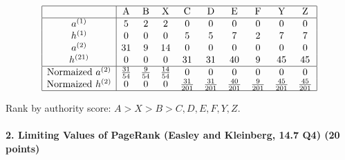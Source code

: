 \documentclass[11pt]{article} %
\begin{document}
\begin{itemize}
$$\begin{array} {|c | c c c c c c c c c|} \hline
 & \text{A} & \text{B} & \text{X} & \text {C} & \text {D} & \text {E} & \text{F}  & \text{Y}  & \text{Z}\\ \hline
a^{(1)} & 5 & 2 & 2 &  0 & 0 & 0 & 0 & 0 & 0\\ 
h^{(1)} & 0 & 0 &  0 & 5 & 5 & 7 & 2 & 7 & 7\\  
a^{(2)} &  31 & 9 & 14 & 0 & 0 & 0 & 0  & 0 & 0\\  
h^{(21)} & 0 & 0 & 0 &  31 & 31 & 40 & 9 & 45& 45  \\ \hline
\text{Normaized} \ a^{(2)} & \frac{31}{54}  & \frac{9}{54}    & \frac{14}{54}   &  0 & 0 & 0 & 0 & 0 & 0 \\  
\text{Normaized} \  h^{(2)}  & 0 & 0  & 0 & \frac{31}{201}   & \frac{31}{201}     & \frac{40}{201}   & \frac{9}{201}    & \frac{45}{201} & \frac{45}{201}    \\ \hline
\end{array}$$

Rank by authority score: $A > X > B > C,D,E,F,Y,Z$.
\end{itemize}













\paragraph{2. Limiting Values of PageRank  (Easley and Kleinberg, 14.7 Q4) (20 points)}
 
\end{document}
